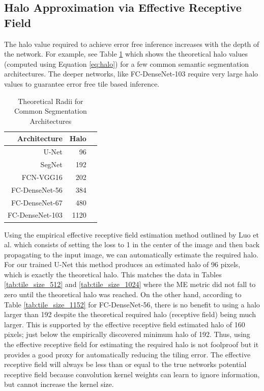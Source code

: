 \documentclass[twoside,11pt]{article}
\begin{document}
\subsection{Halo Approximation via Effective Receptive Field}

The halo value required to achieve error free inference increases with the depth of the network. For example, see Table \ref{tab:common_radii} which shows the theoretical halo values (computed using Equation \ref{eq:halo}) for a few common semantic segmentation architectures. The deeper networks, like FC-DenseNet-103 require very large halo values to guarantee error free tile based inference.

\begin{table}
	\centering
	\caption{Theoretical Radii for Common Segmentation Architectures}
	\label{tab:common_radii}
	\begin{tabular}{r|r|r}
		Architecture & Halo &  \\ 
		\hline
		U-Net \citep{Ronneberger2015a} & 96 \\
		SegNet \citep{Badrinarayanan2015a} & 192 \\
		FCN-VGG16 \citep{Long2015} & 202 \\
		FC-DenseNet-56 \citep{Jegou2017} & 384 \\
		FC-DenseNet-67 \citep{Jegou2017} & 480 \\
		FC-DenseNet-103 \citep{Jegou2017} & 1120 \\
	\end{tabular}
\end{table}

Using the empirical effective receptive field estimation method outlined by Luo et al. \citep{Luo2016} which consists of setting the loss to 1 in the center of the image and then back propagating to the input image, we can automatically estimate the required halo. For our trained U-Net \citep{Ronneberger2015a} this method produces an estimated halo of 96 pixels, which is exactly the theoretical halo. This matches the data in Tables \ref{tab:tile_size_512} and \ref{tab:tile_size_1024} where the ME metric did not fall to zero until the theoretical halo was reached. On the other hand, according to Table \ref{tab:tile_size_1152} for FC-DenseNet-56, there is no benefit to using a halo larger than 192 despite the theoretical required halo (receptive field) being much larger. This is supported by the effective receptive field estimated halo of 160 pixels; just below the empirically discovered minimum halo of 192. Thus, using the effective receptive field for estimating the required halo is not foolproof but it provides a good proxy for automatically reducing the tiling error. 
The effective receptive field will always be less than or equal to the true networks potential receptive field because convolution kernel weights can learn to ignore information, but cannot increase the kernel size.
\end{document}
